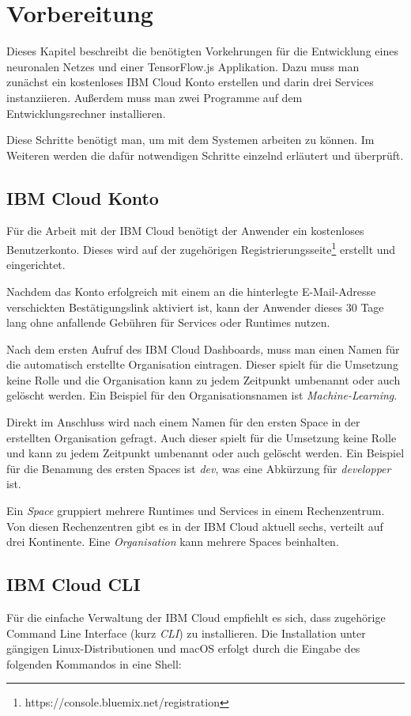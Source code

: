 \section{Vorbereitung}
Dieses Kapitel beschreibt die benötigten Vorkehrungen für die Entwicklung eines neuronalen Netzes und einer
TensorFlow.js Applikation. Dazu muss man zunächst ein kostenloses IBM Cloud Konto erstellen und darin drei Services
instanziieren. Außerdem muss man zwei Programme auf dem Entwicklungsrechner installieren.

Diese Schritte benötigt man, um mit dem Systemen arbeiten zu können. Im Weiteren werden die dafür notwendigen Schritte
einzelnd erläutert und überprüft.

\subsection{IBM Cloud Konto}
Für die Arbeit mit der IBM Cloud benötigt der Anwender ein kostenloses Benutzerkonto. Dieses wird auf der zugehörigen
Registrierungsseite\footnote{https://console.bluemix.net/registration} erstellt und eingerichtet.

Nachdem das Konto erfolgreich mit einem an die hinterlegte E-Mail-Adresse verschickten Bestätigungslink aktiviert ist,
kann der Anwender dieses 30 Tage lang ohne anfallende Gebühren für Services oder Runtimes nutzen.

Nach dem ersten Aufruf des IBM Cloud Dashboards, muss man einen Namen für die automatisch erstellte Organisation
eintragen. Dieser spielt für die Umsetzung keine Rolle und die Organisation kann zu jedem Zeitpunkt umbenannt oder auch
gelöscht werden. Ein Beispiel für den Organisationsnamen ist \textit{Machine-Learning}.

Direkt im Anschluss wird nach einem Namen für den ersten Space in der erstellten Organisation gefragt. Auch dieser
spielt für die Umsetzung keine Rolle und kann zu jedem Zeitpunkt umbenannt oder auch gelöscht werden. Ein Beispiel für
die Benamung des ersten Spaces ist \textit{dev}, was eine Abkürzung für \textit{developper} ist.

Ein \textit{Space} gruppiert mehrere Runtimes und Services in einem Rechenzentrum. Von diesen Rechenzentren gibt es in
der IBM Cloud aktuell sechs, verteilt auf drei Kontinente. Eine \textit{Organisation} kann mehrere Spaces beinhalten.

\subsection{IBM Cloud CLI}
Für die einfache Verwaltung der IBM Cloud empfiehlt es sich, dass zugehörige Command Line Interface (kurz \textit{CLI})
zu installieren. Die Installation unter gängigen Linux-Distributionen und macOS erfolgt durch die Eingabe des folgenden
Kommandos in eine Shell:

